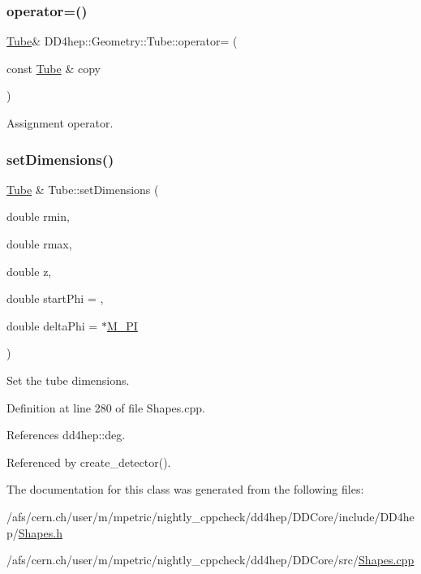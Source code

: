 \subsubsection{\texorpdfstring{operator=()}{operator=()}}
{\footnotesize\ttfamily \hyperlink{class_d_d4hep_1_1_geometry_1_1_tube}{Tube}\& D\+D4hep\+::\+Geometry\+::\+Tube\+::operator= (\begin{DoxyParamCaption}\item[{const \hyperlink{class_d_d4hep_1_1_geometry_1_1_tube}{Tube} \&}]{copy }\end{DoxyParamCaption})\hspace{0.3cm}{\ttfamily [default]}}



Assignment operator. 

\hypertarget{class_d_d4hep_1_1_geometry_1_1_tube_aa1a2e428c08cbd8c7b2e89cc4950a0a1}{}\label{class_d_d4hep_1_1_geometry_1_1_tube_aa1a2e428c08cbd8c7b2e89cc4950a0a1} 
\subsubsection{\texorpdfstring{set\+Dimensions()}{setDimensions()}}
{\footnotesize\ttfamily \hyperlink{class_d_d4hep_1_1_geometry_1_1_tube}{Tube} \& Tube\+::set\+Dimensions (\begin{DoxyParamCaption}\item[{double}]{rmin,  }\item[{double}]{rmax,  }\item[{double}]{z,  }\item[{double}]{start\+Phi = {},  }\item[{double}]{delta\+Phi = {$\ast$\hyperlink{_x_m_l_elements_8h_ae71449b1cc6e6250b91f539153a7a0d3}{M\+\_\+\+PI}} }\end{DoxyParamCaption})}



Set the tube dimensions. 



Definition at line 280 of file Shapes.\+cpp.



References dd4hep\+::deg.



Referenced by create\+\_\+detector().



The documentation for this class was generated from the following files\+:\begin{DoxyCompactItemize}
\item 
/afs/cern.\+ch/user/m/mpetric/nightly\+\_\+cppcheck/dd4hep/\+D\+D\+Core/include/\+D\+D4hep/\hyperlink{_shapes_8h}{Shapes.\+h}\item 
/afs/cern.\+ch/user/m/mpetric/nightly\+\_\+cppcheck/dd4hep/\+D\+D\+Core/src/\hyperlink{_shapes_8cpp}{Shapes.\+cpp}\end{DoxyCompactItemize}

